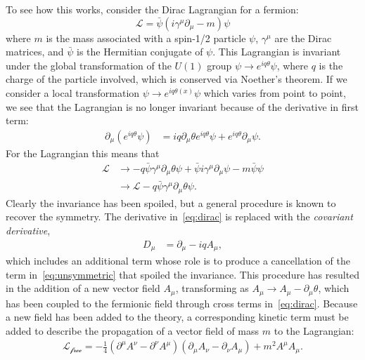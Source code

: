 To see how this works, consider the Dirac Lagrangian for a fermion:
\begin{equation}
  \mathcal{L} = \bar{\psi}(i\gamma^\mu \partial_\mu - m) \psi
  \label{eq:dirac}
\end{equation}
where $m$ is the mass associated with a spin-1/2 particle $\psi$, $\gamma^\mu$ are the Dirac matrices, and $\bar{\psi}$ is the Hermitian conjugate of $\psi$.  This Lagrangian is invariant under the global transformation of the $U(1)$ group $\psi \rightarrow e^{iq\theta} \psi$, where $q$ is the charge of the particle involved, which is conserved via Noether's theorem. If we consider a local transformation $\psi \rightarrow e^{iq\theta(x)} \psi$ which varies from point to point, we see that the Lagrangian is no longer invariant because of the derivative in first term:
\begin{align}
  \partial_\mu(e^{iq\theta}\psi)
  &= iq\partial_\mu \theta e^{iq\theta}\psi + e^{iq\theta}\partial_\mu\psi.
\end{align}
For the Lagrangian this means that
\begin{align}
  \mathcal{L} &\rightarrow
    - q \bar{\psi}\gamma^\mu \partial_\mu \theta \psi
    + \bar{\psi}i\gamma^\mu \partial_\mu\psi
    - m \bar{\psi} \psi \\
  &\rightarrow
  \mathcal{L}
    - q \bar{\psi} \gamma^\mu \partial_\mu \theta \psi.
  \label{eq:unsymmetric}
\end{align}
Clearly the invariance has been spoiled, but a general procedure is known to
recover the symmetry. The derivative in~\cref{eq:dirac} is replaced with the
\textit{covariant derivative},
\begin{align}
  D_\mu &= \partial_\mu - i q A_\mu,
\end{align}
which includes an additional term whose role is to produce a cancellation of the
term in~\cref{eq:unsymmetric} that spoiled the invariance. This procedure has
resulted in the addition of a new vector field $A_\mu$, transforming as $A_\mu
\rightarrow A_\mu-\partial_\mu \theta$, which has been coupled to the fermionic
field through cross terms in~\cref{eq:dirac}. Because a new field has been added
to the theory, a corresponding kinetic term must be added to describe the
propagation of a vector field of mass $m$ to the Lagrangian:
\begin{align}
  \mathcal{L_\text{free}} =
    - \frac{1}{4}(\partial^\mu A^\nu
    - \partial^\nu A^\mu)(\partial_\mu A_\nu - \partial_\nu A_\mu)
    + m^2A^\mu A_\mu.
\label{eq:proca}
\end{align}
